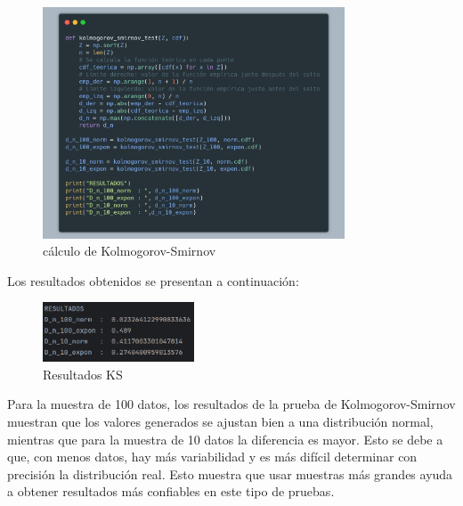\documentclass[a4paper,12pt]{article}
\begin{document}
	\begin{figure}[H]
		\centering
		\includegraphics[width=0.8\textwidth]{carbon2.png}
		\caption{c\'alculo de Kolmogorov-Smirnov}
		\label{fig:ejemplo}
	\end{figure}
	
	Los resultados obtenidos se presentan a continuaci\'on:
	
	\begin{figure}[H]
		\centering
		\includegraphics[width=0.4\textwidth]{resultados.png}
		\caption{Resultados KS}
		\label{fig:ejemplo}
	\end{figure}
	
	Para la muestra de 100 datos, los resultados de la prueba de Kolmogorov-Smirnov muestran que los valores generados se ajustan bien a una distribución normal, mientras que para la muestra de 10 datos la diferencia es mayor. Esto se debe a que, con menos datos, hay más variabilidad y es más difícil determinar con precisión la distribución real. Esto muestra que usar muestras más grandes ayuda a obtener resultados más confiables en este tipo de pruebas.
	
\end{document}
